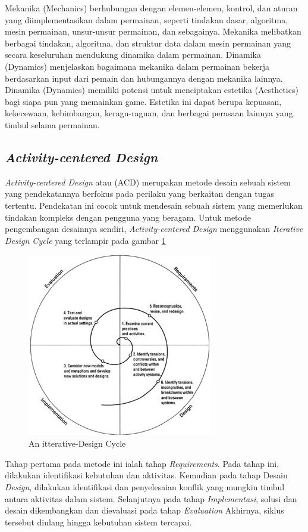 Mekanika (Mechanics) berhubungan dengan elemen-elemen, kontrol, dan aturan yang diimplementasikan dalam permainan, seperti tindakan dasar, algoritma, mesin permainan, unsur-unsur permainan, dan sebagainya.
Mekanika melibatkan berbagai tindakan, algoritma, dan struktur data dalam mesin permainan yang secara keseluruhan mendukung dinamika dalam permainan.
Dinamika (Dynamics) menjelaskan bagaimana mekanika dalam permainan bekerja berdasarkan input dari pemain dan hubungannya dengan mekanika lainnya.
Dinamika (Dynamics) memiliki potensi untuk menciptakan estetika (Aesthetics) bagi siapa pun yang memainkan game. Estetika ini dapat berupa kepuasan, kekecewaan, kebimbangan, keragu-raguan, dan berbagai perasaan lainnya yang timbul selama permainan.
\subsection{\textit{Activity-centered Design}}
\textit{Activity-centered Design} atau (ACD) merupakan metode desain sebuah sistem yang pendekatannya berfokus pada perilaku yang berkaitan dengan tugas tertentu.
Pendekatan ini cocok untuk mendesain sebuah sistem yang memerlukan tindakan kompleks dengan pengguna yang beragam.
Untuk metode pengembangan desainnya sendiri, \textit{Activity-centered Design} menggunakan \textit{Iterative Design Cycle} yang terlampir pada gambar \ref*{Fig:itterative-Design Cycle}
\begin{figure}[H]
	\centering
	\includegraphics[height=8cm]{contents/chapter-2/images/Itterative-design.png}
	\caption[Caption]{An itterative-Design Cycle \cite{2004activity}}
	\label{Fig:itterative-Design Cycle}
\end{figure}
Tahap pertama pada metode ini ialah tahap \textit{Requirements}. Pada tahap ini, dilakukan identifikasi kebutuhan dan aktivitas. 
Kemudian pada tahap Desain \textit{Design}, dilakukan identifikasi dan penyelesaian konflik yang mungkin timbul antara aktivitas dalam sistem.
Selanjutnya pada tahap \textit{Implementasi}, solusi dan desain dikembangkan dan dievaluasi pada tahap \textit{Evaluation}
Akhirnya, siklus tersebut diulang hingga kebutuhan sistem tercapai.
